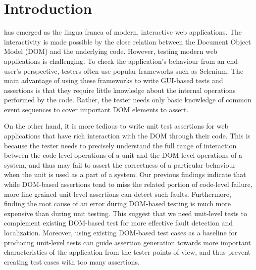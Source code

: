 \section{Introduction} \label{Sec:intro}

\javascript has emerged as the lingua franca of modern, interactive web applications. 
The interactivity is made possible by the close relation between the Document Object Model (DOM) and the underlying \javascript code.
However, testing modern web applications is challenging.  
To check the application's behaviour from an end-user's perspective, testers often use popular frameworks such as Selenium. 
The main advantage of using these frameworks to write GUI-based tests and assertions is that they require little knowledge about the internal operations performed by the code. 
Rather, the tester needs only basic knowledge of common event sequences to cover important DOM elements to assert. 

 
On the other hand, it is more tedious to
write unit test assertions for web applications that have rich interaction with the DOM through their \javascript code. 
This is because the tester needs to precisely understand the full range of interaction between the code level operations of a unit and the DOM level operations of a system, and thus may fail to assert the correctness of a particular behaviour when the unit is used as a part of a system. 
Our previous findings \cite{mirshokraie:icst15} indicate that while DOM-based assertions tend to miss the related portion of
code-level failure, more fine grained unit-level assertions can detect such faults. 
Furthermore, finding the root cause of an error during DOM-based testing is much more expensive than during unit testing.
This suggest that we need unit-level tests to complement existing DOM-based test for more effective fault detection and localization. Moreover, using existing DOM-based test cases as a baseline for producing unit-level tests can guide assertion generation towards more important characteristics of the application from the tester points of view, and thus prevent creating test cases with too many assertions.    


